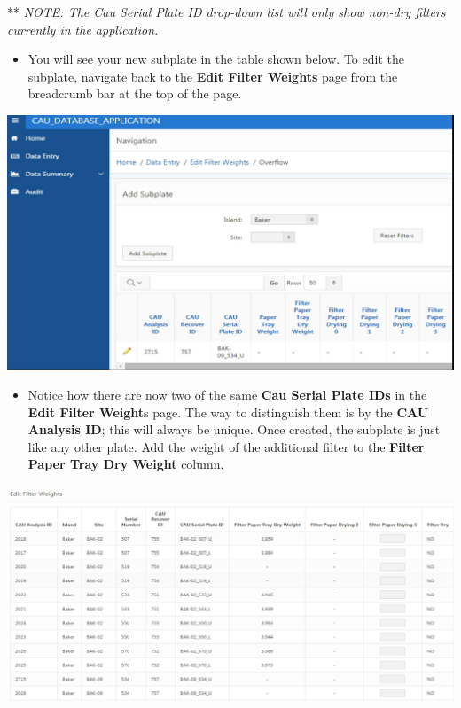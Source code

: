 \documentclass[]{book}
\providecommand{\tightlist}{%
  \setlength{\itemsep}{0pt}\setlength{\parskip}{0pt}}
\begin{document}
** \emph{NOTE: The Cau Serial Plate ID drop-down list will only show non-dry filters currently in the application.}

\begin{itemize}
\tightlist
\item
  You will see your new subplate in the table shown below. To edit the subplate, navigate back to the \textbf{Edit Filter Weights} page from the breadcrumb bar at the top of the page.
\end{itemize}

\includegraphics{images/Data20.jpg}

\begin{itemize}
\tightlist
\item
  Notice how there are now two of the same \textbf{Cau Serial Plate IDs} in the \textbf{Edit Filter Weight}s page. The way to distinguish them is by the \textbf{CAU Analysis ID}; this will always be unique. Once created, the subplate is just like any other plate. Add the weight of the additional filter to the \textbf{Filter Paper Tray Dry Weight} column.
\end{itemize}

\includegraphics{images/Data21.jpg}
\end{document}
